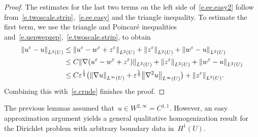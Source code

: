 \documentclass[11pt,twoside]{article} %
\numberwithin{equation}{section}
\theoremstyle{definition}
\let\originalleft\left
\let\originalright\right
\renewcommand{\left}{\mathopen{}\mathclose\bgroup\originalleft}
\renewcommand{\right}{\aftergroup\egroup\originalright}
\newcommand{\eps}{\varepsilon}
\newcommand{\ep}{\eps}
\begin{document}
\begin{proof}
The estimates for the last two terms on the left side of~\eqref{e.ee.easy2} follow from~\eqref{e.twoscale.strip},~\eqref{e.ee.easy} and the triangle inequality. To estimate the first term, we use the triangle and Poincar\'e inequalities and~\eqref{e.uepwepzep},~\eqref{e.twoscale.strip}, to obtain
\begin{align*}
\left\| u^\ep - u \right\|_{L^2(U)}
&
\leq
\left\| u^\ep - w^\ep+z^\ep \right\|_{L^2(U)}
+
\left\| z^\ep \right\|_{L^2(U)} 
+ \left\| w^\ep - u\right\|_{L^2(U)}
\notag \\ & 
\leq
C
\left\| \nabla( u^\ep - w^\ep+z^\ep) \right\|_{L^2(U)}
+
\left\| z^\ep \right\|_{L^2(U)} 
+ \left\| w^\ep - u\right\|_{L^2(U)}
\notag \\ & 
\leq
C \ep^{\frac12} \bigl (  \left\| \nabla u \right\|_{L^\infty(U)}
+
\ep^{\frac12} \left\| \nabla^2 u \right\|_{L^\infty(U)}\bigr )
+
\left\| z^\ep\right\|_{L^2(U)}.
\end{align*}
Combining this with~\eqref{e.crude} finishes the proof. 
\end{proof}


The previous lemmas assumed that~$u\in W^{2,\infty}= C^{1,1}$. However, an easy approximation argument yields a general qualitative homogenization result for the Dirichlet problem with arbitrary boundary data in~$H^1(U)$. 
\end{document}
